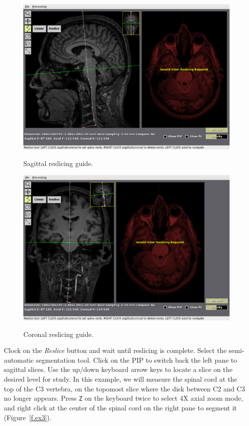 \documentclass[12pt]{report}
\begin{document}
\begin{figure}[!htb]
\begin{center}
\includegraphics[width=12cm]{ex1.eps}
\caption{Sagittal reslicing guide.}
\label{f.ex1}
\vspace{20pt}
\includegraphics[width=12cm]{ex2.eps}
\caption{Coronal reslicing guide.}
\label{f.ex2}
\end{center}
\end{figure}


Clock on the \emph{Reslice} button and wait until reslicing is
complete. Select the semi-automatic segmentation tool. Click on the
PIP to switch back the left pane to sagittal slices. Use the up/down
keyboard arrow keys to locate a slice on the desired level for study.
In this example, we will measure the spinal cord at the top of the C3
vertebra, on the topomost slice where the disk between C2 and C3 no longer
appears. Press \texttt{Z} on the keyboard twice to select
4X axial zoom mode, and right click at the center of the spinal cord on the right
pane to segment it (Figure~\ref{f.ex3}).
\end{document}
